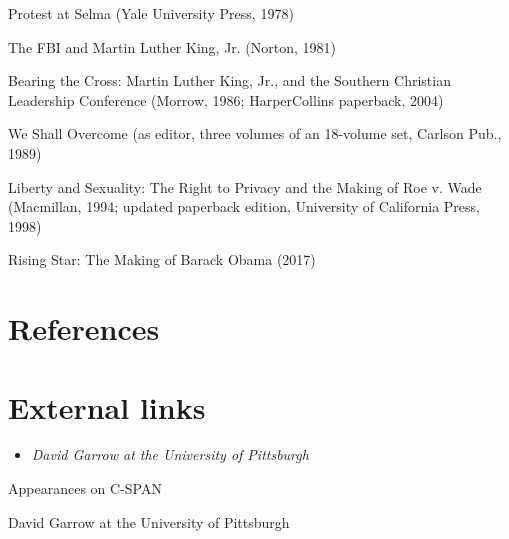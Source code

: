 Protest at Selma (Yale University Press, 1978)

The FBI and Martin Luther King, Jr. (Norton, 1981)

Bearing the Cross: Martin Luther King, Jr., and the Southern Christian
Leadership Conference (Morrow, 1986; HarperCollins paperback, 2004)

We Shall Overcome (as editor, three volumes of an 18-volume set, Carlson
Pub., 1989)

Liberty and Sexuality: The Right to Privacy and the Making of Roe v.
Wade (Macmillan, 1994; updated paperback edition, University of
California Press, 1998)

Rising Star: The Making of Barack Obama (2017)

\section{References}\label{references}

\section{External links}\label{external-links}

\begin{itemize}
\item
  \emph{David Garrow at the University of Pittsburgh}
\end{itemize}

Appearances on C-SPAN

David Garrow at the University of Pittsburgh
